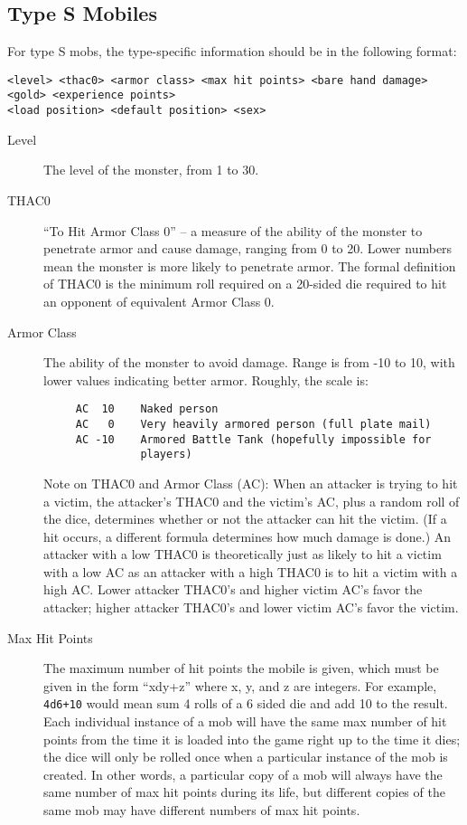 \documentclass[11pt]{article}
\begin{document}
\subsection{Type S Mobiles}
For type S mobs, the type-specific information should be in the following format:
\begin{verbatim}
<level> <thac0> <armor class> <max hit points> <bare hand damage>
<gold> <experience points>
<load position> <default position> <sex>
\end{verbatim}
\begin{description}
\item[Level] The level of the monster, from 1 to 30.
\item[THAC0] ``To Hit Armor Class 0'' -- a measure of the ability of the monster to penetrate armor and cause damage, ranging from 0 to 20.  Lower numbers mean the monster is more likely to penetrate armor.  The formal definition of THAC0 is the minimum roll required on a 20-sided die required to hit an opponent of equivalent Armor Class 0.
\item[Armor Class] The ability of the monster to avoid damage.  Range is from -10 to 10, with lower values indicating better armor.  Roughly, the scale is:
\begin{verbatim}
     AC  10    Naked person
     AC   0    Very heavily armored person (full plate mail)
     AC -10    Armored Battle Tank (hopefully impossible for
               players)
\end{verbatim}
Note on THAC0 and Armor Class (AC): When an attacker is trying to hit a victim, the attacker's THAC0 and the victim's AC, plus a random roll of the dice, determines whether or not the attacker can hit the victim.  (If a hit occurs, a different formula determines how much damage is done.)  An attacker with a low THAC0 is theoretically just as likely to hit a victim with a low AC as an attacker with a high THAC0 is to hit a victim with a high AC.  Lower attacker THAC0's and higher victim AC's favor the attacker; higher attacker THAC0's and lower victim AC's favor the victim.
\item[Max Hit Points] The maximum number of hit points the mobile is given, which must be given in the form ``xdy+z'' where x, y, and z are integers.  For example, \texttt{4d6+10} would mean sum 4 rolls of a 6 sided die and add 10 to the result.  Each individual instance of a mob will have the same max number of hit points from the time it is loaded into the game right up to the time it dies; the dice will only be rolled once when a particular instance of the mob is created.  In other words, a particular copy of a mob will always have the same number of max hit points during its life, but different copies of the same mob may have different numbers of max hit points.

\end{description}
\end{document}
